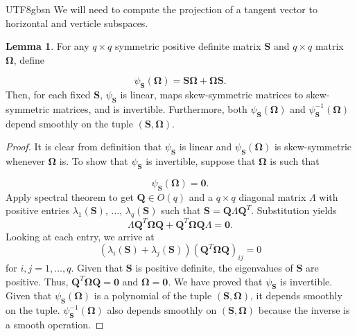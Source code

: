 \documentclass[12pt]{report}
\theoremstyle{plain}
\theoremstyle{definition}
\newtheorem{lemma}[theorem]{Lemma}
\begin{document}
\begin{CJK*}{UTF8}{gbsn}
We will need to compute the projection of a tangent 
vector to horizontal and verticle subspaces.

\begin{lemma}\label{thm:psi_S}
For any $q \times q$ symmetric positive definite matrix $\bm{S}$
and $q \times q$ matrix $\bm{\Omega}$,
define 

\begin{equation*}
  \psi_{\bm{S}}(\bm{\Omega}) = \bm{S} \bm{\Omega} + \bm{\Omega} \bm{S}.
\end{equation*}
Then, for each fixed $\bm{S}$, $\psi_{\bm{S}}$ is linear, 
maps skew-symmetric matrices to skew-symmetric matrices,
and is invertible. Furthermore, 
both $\psi_{\bm{S}}(\bm{\Omega})$
and $\psi_{\bm{S}}^{-1}(\bm{\Omega})$
depend smoothly on the tuple $(\bm{S}, \bm{\Omega})$.
\end{lemma}

\begin{proof}
It is clear from definition that $\psi_{\bm{S}}$ is linear and
$\psi_{\bm{S}}(\bm{\Omega})$ is skew-symmetric whenever $\bm{\Omega}$ is.
To show that $\psi_{\bm{S}}$ is invertible,
suppose that $\bm{\Omega}$ is such that 

\begin{equation*}
  \psi_{\bm{S}}(\bm{\Omega}) = \bm{0}.
\end{equation*}
Apply spectral theorem to get $\bm{Q} \in O(q)$ 
and a $q \times q$ diagonal matrix $\Lambda$ with positive entries 
$\lambda_1(\bm{S})$, $\ldots$, $\lambda_q(\bm{S})$
such that $\bm{S} = \bm{Q} \Lambda \bm{Q}^T$.
Substitution yields 
\begin{equation*}
  \Lambda \bm{Q}^T \bm{\Omega} \bm{Q} + \bm{Q}^T \bm{\Omega} \bm{Q} \Lambda = \bm{0}.
\end{equation*}
Looking at each entry, we arrive at 
\begin{equation*}
  (\lambda_i(\bm{S}) + \lambda_j(\bm{S})) 
(\bm{Q}^T \bm{\Omega} \bm{Q})_{ij} = 0
\end{equation*}
for $i,j = 1, \ldots, q$.
Given that $\bm{S}$ is positive definite, 
the eigenvalues of $\bm{S}$ are positive.
Thus, 
$\bm{Q}^T \bm{\Omega} \bm{Q} = \bm{0}$
and $\bm{\Omega} = \bm{0}$.
We have proved that $\psi_{\bm{S}}$ is invertible.
Given that $\psi_{\bm{S}}(\bm{\Omega})$ is a polynomial of the tuple $(\bm{S}, \bm{\Omega})$,
it depends smoothly on the tuple.
$\psi_{\bm{S}}^{-1}(\bm{\Omega})$ also depends smoothly on 
$(\bm{S}, \bm{\Omega})$ because the inverse is a smooth operation.
\end{proof}


\end{CJK*}
\end{document}
